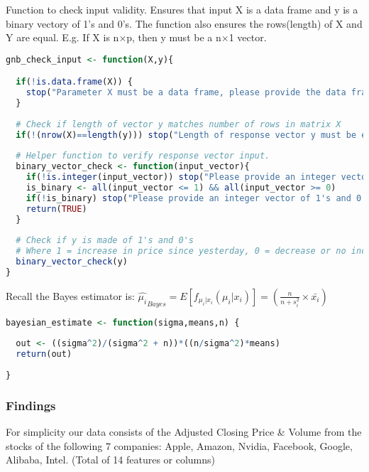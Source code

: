 \documentclass{article}
\begin{document}
Function to check input validity. Ensures that input X is a data frame and y is a binary vectory of 1's and 0's. The function also ensures the rows(length) of X and Y are equal. E.g. If X is n$\times$p, then y must be a n$\times$1 vector.
\begin{lstlisting}[language=R]
gnb_check_input <- function(X,y){

  if(!is.data.frame(X)) {
    stop("Parameter X must be a data frame, please provide the data frame whose columns are numeric variables and rows are observations")
  }
  
  # Check if length of vector y matches number of rows in matrix X
  if(!(nrow(X)==length(y))) stop("Length of response vector y must be equal to number of rows in X")
  
  # Helper function to verify response vector input.
  binary_vector_check <- function(input_vector){
    if(!is.integer(input_vector)) stop("Please provide an integer vector")    
    is_binary <- all(input_vector <= 1) && all(input_vector >= 0)    
    if(!is_binary) stop("Please provide an integer vector of 1's and 0's")
    return(TRUE)
  }
  
  # Check if y is made of 1's and 0's
  # Where 1 = increase in price since yesterday, 0 = decrease or no increase
  binary_vector_check(y)
}

\end{lstlisting}

Recall the Bayes estimator is:  $\hat{\mu_{i}}_{Bayes} = E[f_{\mu_{i}|x_{i}}(\mu_{i}|x_{i})] = (\frac{n}{n + s_i^2}\times \bar{x_{i}})$\newline

\begin{lstlisting}[language=R]
bayesian_estimate <- function(sigma,means,n) {
  
  out <- ((sigma^2)/(sigma^2 + n))*((n/sigma^2)*means)
  return(out)
  
}

\end{lstlisting}

\newpage
\subsubsection{Findings}

For simplicity our data consists of the Adjusted Closing Price \& Volume from the stocks of the following 7 companies: Apple, Amazon, Nvidia, Facebook, Google, Alibaba, Intel. (Total of 14 features or columns)\newline
\end{document}
